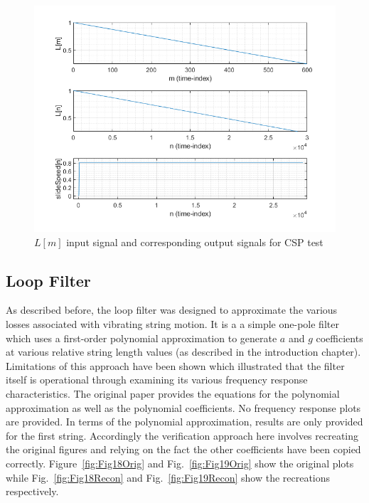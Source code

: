 \documentclass[../main.tex]{subfiles}
\begin{document}
\begin{figure}[h]
    \centering
    \includegraphics[scale=.65]{./images/plots/CSPTest.png}
    \caption{$L[m]$ input signal and corresponding output signals for CSP test}
    \label{fig:CSPTest}
\end{figure}

\subsection{Loop Filter}
As described before, the loop filter was designed to approximate the various losses associated with vibrating string motion. It is a a simple one-pole filter which uses a first-order polynomial approximation to generate $a$ and $g$ coefficients at various relative string length values (as described in the introduction chapter). Limitations of this approach have been shown which illustrated that the filter itself is operational through examining its various frequency response characteristics. The original paper provides the equations for the polynomial approximation as well as the polynomial coefficients. No frequency response plots are provided. In terms of the polynomial approximation, results are only provided for the first string. Accordingly the verification approach here involves recreating the original figures and relying on the fact the other coefficients have been copied correctly. Figure~\ref{fig:Fig18Orig} and Fig.~\ref{fig:Fig19Orig} show the original plots while Fig.~\ref{fig:Fig18Recon} and Fig.~\ref{fig:Fig19Recon} show the recreations respectively.
\end{document}
